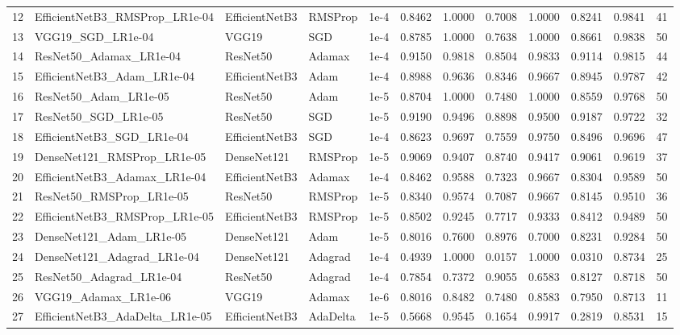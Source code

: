 \begin{longtable}{r l l l r r r r r r r r}
   12 & EfficientNetB3\_RMSProp\_LR1e-04 & EfficientNetB3 & RMSProp & 1e-4 & 0.8462 & 1.0000 & 0.7008 & 1.0000 & 0.8241 & 0.9841 & 41 \\
   13 & VGG19\_SGD\_LR1e-04       & VGG19 & SGD & 1e-4 & 0.8785 & 1.0000 & 0.7638 & 1.0000 & 0.8661 & 0.9838 & 50 \\
   14 & ResNet50\_Adamax\_LR1e-04 & ResNet50 & Adamax & 1e-4 & 0.9150 & 0.9818 & 0.8504 & 0.9833 & 0.9114 & 0.9815 & 44 \\
   15 & EfficientNetB3\_Adam\_LR1e-04 & EfficientNetB3 & Adam & 1e-4 & 0.8988 & 0.9636 & 0.8346 & 0.9667 & 0.8945 & 0.9787 & 42 \\
   16 & ResNet50\_Adam\_LR1e-05   & ResNet50 & Adam & 1e-5 & 0.8704 & 1.0000 & 0.7480 & 1.0000 & 0.8559 & 0.9768 & 50 \\
   17 & ResNet50\_SGD\_LR1e-05    & ResNet50 & SGD & 1e-5 & 0.9190 & 0.9496 & 0.8898 & 0.9500 & 0.9187 & 0.9722 & 32 \\
   18 & EfficientNetB3\_SGD\_LR1e-04 & EfficientNetB3 & SGD & 1e-4 & 0.8623 & 0.9697 & 0.7559 & 0.9750 & 0.8496 & 0.9696 & 47 \\
   19 & DenseNet121\_RMSProp\_LR1e-05 & DenseNet121 & RMSProp & 1e-5 & 0.9069 & 0.9407 & 0.8740 & 0.9417 & 0.9061 & 0.9619 & 37 \\
   20 & EfficientNetB3\_Adamax\_LR1e-04 & EfficientNetB3 & Adamax & 1e-4 & 0.8462 & 0.9588 & 0.7323 & 0.9667 & 0.8304 & 0.9589 & 50 \\
   21 & ResNet50\_RMSProp\_LR1e-05 & ResNet50 & RMSProp & 1e-5 & 0.8340 & 0.9574 & 0.7087 & 0.9667 & 0.8145 & 0.9510 & 36 \\
   22 & EfficientNetB3\_RMSProp\_LR1e-05 & EfficientNetB3 & RMSProp & 1e-5 & 0.8502 & 0.9245 & 0.7717 & 0.9333 & 0.8412 & 0.9489 & 50 \\
   23 & DenseNet121\_Adam\_LR1e-05 & DenseNet121 & Adam & 1e-5 & 0.8016 & 0.7600 & 0.8976 & 0.7000 & 0.8231 & 0.9284 & 50 \\
   24 & DenseNet121\_Adagrad\_LR1e-04 & DenseNet121 & Adagrad & 1e-4 & 0.4939 & 1.0000 & 0.0157 & 1.0000 & 0.0310 & 0.8734 & 25 \\
   25 & ResNet50\_Adagrad\_LR1e-04 & ResNet50 & Adagrad & 1e-4 & 0.7854 & 0.7372 & 0.9055 & 0.6583 & 0.8127 & 0.8718 & 50 \\
   26 & VGG19\_Adamax\_LR1e-06    & VGG19 & Adamax & 1e-6 & 0.8016 & 0.8482 & 0.7480 & 0.8583 & 0.7950 & 0.8713 & 11 \\
   27 & EfficientNetB3\_AdaDelta\_LR1e-05 & EfficientNetB3 & AdaDelta & 1e-5 & 0.5668 & 0.9545 & 0.1654 & 0.9917 & 0.2819 & 0.8531 & 15 \\

\end{longtable}
